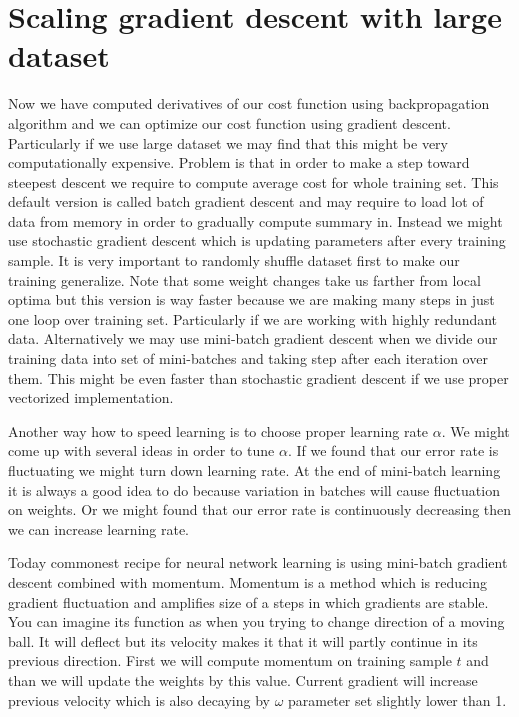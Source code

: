 \section{Scaling gradient descent with large dataset}
Now we have computed derivatives of our cost function using backpropagation algorithm and we can optimize our cost function using gradient descent. Particularly if we use large dataset we may find that this might be very computationally expensive. Problem is that in order to make a step toward steepest descent we require to compute average cost for whole training set. This default version is called batch gradient descent and may require to load lot of data from memory in order to gradually compute summary in. Instead we might use stochastic gradient descent which is updating parameters after every training sample. It is very important to  randomly shuffle dataset first to make our training generalize. Note that some weight changes take us farther from local optima but this version is way faster because we are making many steps in just one loop over training set. Particularly if we are working with highly redundant data. Alternatively we may use mini-batch gradient descent when we divide our training data into set of mini-batches and taking step after each iteration over them. This might be even faster than stochastic gradient descent if we use proper vectorized implementation.

Another way how to speed learning is to choose proper learning rate \(\alpha\). We might come up with several ideas in order to tune \(\alpha\). If we found that our error rate is fluctuating we might turn down learning rate. At the end of mini-batch learning it is always a good idea to do because variation in batches will cause fluctuation on weights. Or we might found that our error rate is continuously decreasing then we can increase learning rate.

Today commonest recipe for neural network learning is using mini-batch gradient descent combined  with momentum. Momentum is a method which is reducing gradient fluctuation and amplifies size of a steps in which gradients are stable. You can imagine its function as when you trying to change direction of a moving ball. It will deflect but its velocity makes it that it will partly continue in its previous direction. First we will compute momentum on training sample \(t\) and than we will update the weights by this value. Current gradient will increase previous velocity which is also decaying by \(\omega\) parameter set slightly lower than 1.

